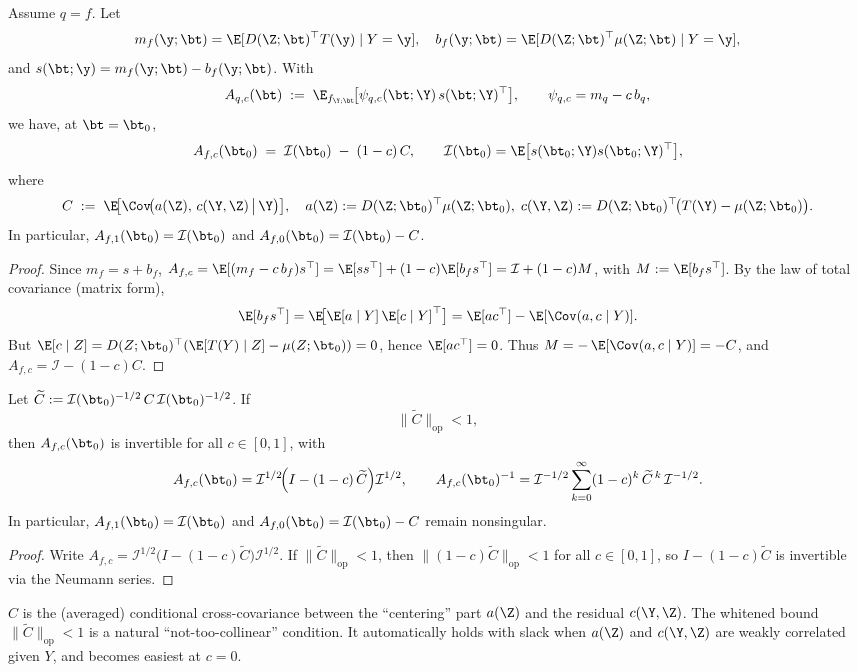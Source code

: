 \begin{proposition}[Exact path for $q=f$]
Assume $q=f$. Let
\[
m_f(\y;\bt)=\E[D(\Z;\bt)^\top T(\y)\mid Y=\y],\quad
b_f(\y;\bt)=\E[D(\Z;\bt)^\top \mu(\Z;\bt)\mid Y=\y],
\]
and $s(\bt;\y)=m_f(\y;\bt)-b_f(\y;\bt)$. With
\[
A_{q,c}(\bt)\;:=\;\E_{f_{\Y;\bt}}\!\big[\psi_{q,c}(\bt;\Y)\,s(\bt;\Y)^\top\big],\qquad
\psi_{q,c}=m_q-c\,b_q,
\]
we have, at $\bt=\bt_0$,
\[
A_{f,c}(\bt_0)\;=\;\mathcal I(\bt_0)\;-\;(1-c)\,C,\qquad
\mathcal I(\bt_0)=\E\big[s(\bt_0;\Y)s(\bt_0;\Y)^\top\big],
\]
where
\[
C\;:=\;\E\!\big[\Cov\!\big(a(\Z),\,c(\Y,\Z)\,\big|\,\Y\big)\big],\quad
a(\Z):=D(\Z;\bt_0)^\top\mu(\Z;\bt_0),\;
c(\Y,\Z):=D(\Z;\bt_0)^\top\!\big(T(\Y)-\mu(\Z;\bt_0)\big).
\]
In particular, $A_{f,1}(\bt_0)=\mathcal I(\bt_0)$ and
$A_{f,0}(\bt_0)=\mathcal I(\bt_0)-C$.
\end{proposition}

\begin{proof}
Since $m_f=s+b_f$, 
$A_{f,c}=\E[(m_f-c\,b_f)s^\top]=\E[ss^\top]+(1-c)\E[b_f s^\top]=\mathcal I+(1-c)M$,
with $M:=\E[b_f s^\top]$.
By the law of total covariance (matrix form),
\[
\E[b_f s^\top]=\E\!\big[\E[a\mid Y]\,\E[c\mid Y]^\top\big]
=\E[ac^\top]-\E[\Cov(a,c\mid Y)].
\]
But $\E[c\mid Z]=D(Z;\bt_0)^\top(\E[T(Y)\mid Z]-\mu(Z;\bt_0))=0$, hence $\E[ac^\top]=0$.
Thus $M=-\,\E[\Cov(a,c\mid Y)]= -C$, and $A_{f,c}=\mathcal I-(1-c)C$.
\end{proof}

\begin{theorem}
Let $\widetilde C:=\mathcal I(\bt_0)^{-1/2}\,C\,\mathcal I(\bt_0)^{-1/2}$. If
\[
\|\widetilde C\|_{\mathrm{op}}<1,
\]
then $A_{f,c}(\bt_0)$ is invertible for all $c\in[0,1]$, with
\[
A_{f,c}(\bt_0)
=\mathcal I^{1/2}\!\Big(I-(1-c)\,\widetilde C\Big)\mathcal I^{1/2},\qquad
A_{f,c}(\bt_0)^{-1}
=\mathcal I^{-1/2}\sum_{k=0}^{\infty}(1-c)^k\,\widetilde C^{\,k}\,\mathcal I^{-1/2}.
\]
In particular, $A_{f,1}(\bt_0)=\mathcal I(\bt_0)$ and $A_{f,0}(\bt_0)=\mathcal I(\bt_0)-C$ remain nonsingular.
\end{theorem}

\begin{proof}
Write $A_{f,c}=\mathcal I^{1/2}\!\big(I-(1-c)\widetilde C\big)\mathcal I^{1/2}$. 
If $\|\widetilde C\|_{\mathrm{op}}<1$, then $\| (1-c)\widetilde C \|_{\mathrm{op}}<1$
for all $c\in[0,1]$, so $I-(1-c)\widetilde C$ is invertible via the Neumann series.
\end{proof}

\begin{remark}[Interpretation]
$C$ is the (averaged) conditional cross-covariance between the “centering” part $a(\Z)$
and the residual $c(\Y,\Z)$. The whitened bound $\|\widetilde C\|_{\mathrm{op}}<1$ is a
natural “not-too-collinear” condition. It automatically holds with slack when $a(\Z)$ and
$c(\Y,\Z)$ are weakly correlated given $Y$, and becomes easiest at $c=0$.
\end{remark}


